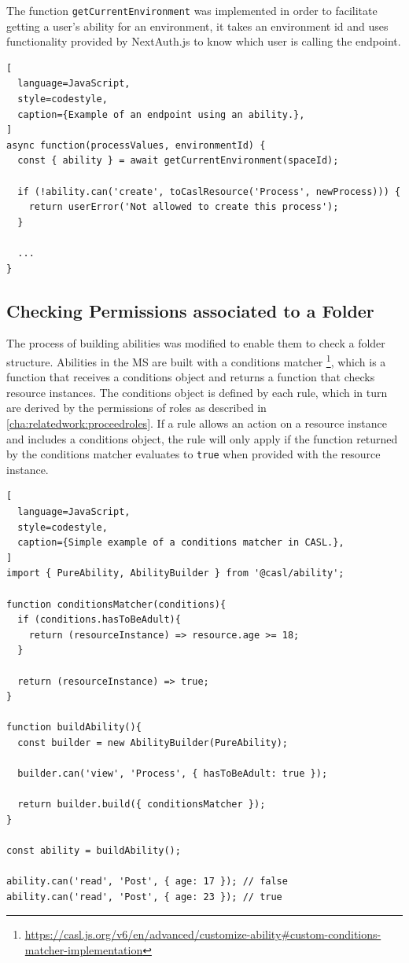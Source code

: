 The function \lstinline{getCurrentEnvironment} was implemented in order to facilitate
getting a user's ability for an environment, it takes an environment id and uses
functionality provided by NextAuth.js to know which user is calling the endpoint.

\begin{lstlisting}[
  language=JavaScript,
  style=codestyle,
  caption={Example of an endpoint using an ability.},
]
async function(processValues, environmentId) {
  const { ability } = await getCurrentEnvironment(spaceId);

  if (!ability.can('create', toCaslResource('Process', newProcess))) {
    return userError('Not allowed to create this process');
  }

  ...
}
\end{lstlisting}

\subsection{Checking Permissions associated to a Folder}

The process of building abilities was modified to enable them to check a folder structure.
Abilities in the MS are built with a conditions matcher
\footnote{\url{https://casl.js.org/v6/en/advanced/customize-ability\#custom-conditions-matcher-implementation}},
which is a function that receives a conditions object and returns a function that checks
resource instances.
The conditions object is defined by each rule, which in turn are derived by the
permissions of roles as described in \ref{cha:relatedwork:proceedroles}.
If a rule allows an action on a resource instance and includes a conditions object, the
rule will only apply if the function returned by the conditions matcher evaluates to
\lstinline{true} when provided with the resource instance.

\begin{lstlisting}[
  language=JavaScript,
  style=codestyle,
  caption={Simple example of a conditions matcher in CASL.},
]
import { PureAbility, AbilityBuilder } from '@casl/ability';

function conditionsMatcher(conditions){
  if (conditions.hasToBeAdult){
    return (resourceInstance) => resource.age >= 18;
  }

  return (resourceInstance) => true;
}

function buildAbility(){
  const builder = new AbilityBuilder(PureAbility);

  builder.can('view', 'Process', { hasToBeAdult: true });

  return builder.build({ conditionsMatcher });
}

const ability = buildAbility();

ability.can('read', 'Post', { age: 17 }); // false
ability.can('read', 'Post', { age: 23 }); // true
\end{lstlisting}

